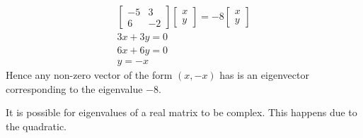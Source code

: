 \documentclass[a4paper]{article}
\theoremstyle{plain}
\theoremstyle{definition}
\newtheorem{exmp}{Example}[section]
\theoremstyle{remark}
\begin{document}
\begin{tcolorbox}[colback=black!3!white,colframe=black!60!white,title=\begin{exmp}Example 1 \label{Example 1}\end{exmp}]
	\begin{align*}
		\begin{bmatrix} -5 & 3 \\ 6 & -2 \end{bmatrix} \begin{bmatrix} x \\ y \end{bmatrix} = -8 \begin{bmatrix} x \\ y \end{bmatrix} \\
		3x+3y = 0 \\
		6x+6y = 0 \\
		y= -x
	\end{align*}
Hence any non-zero vector of the form $(x,-x)$ has is an eigenvector corresponding to the eigenvalue $-8$.
\end{tcolorbox}
It is possible for eigenvalues of a real matrix to be complex. This happens due to the quadratic.
\end{document}
